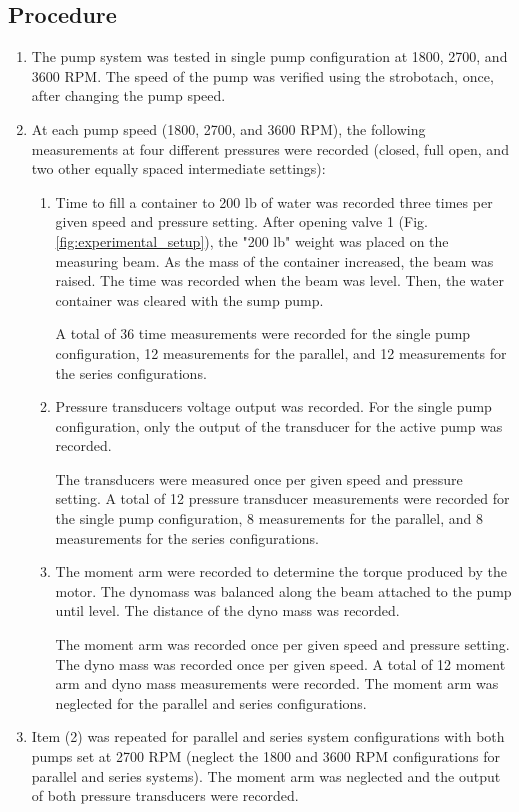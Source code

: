 \subsection{Procedure}
\begin{enumerate}[label=\arabic*.]
    \item The pump system was tested in single pump configuration at 1800, 2700, and 3600 RPM. The speed of the pump was verified using the strobotach, once, after changing the pump speed.
    \item At each pump speed (1800, 2700, and 3600 RPM), the following measurements at four different pressures were recorded (closed, full open, and two other equally spaced intermediate settings):
    \begin{enumerate}[label=\roman*.]
        \item Time to fill a container to 200 lb of water was recorded three times per given speed and pressure setting. After opening valve 1 (Fig.\ref{fig:experimental_setup}), the "200 lb" weight was placed on the measuring beam. As the mass of the container increased, the beam was raised. The time was recorded when the beam was level. Then, the water container was cleared with the sump pump. 
        
        \indent A total of 36 time measurements were recorded for the single pump configuration, 12 measurements for the parallel, and 12 measurements for the series configurations.
        \item Pressure transducers voltage output was recorded. For the single pump configuration, only the output of the transducer for the active pump was recorded. 
        
        \indent The transducers were measured once per given speed and pressure setting. A total of 12 pressure transducer measurements were recorded for the single pump configuration, 8 measurements for the parallel, and 8 measurements for the series configurations. 
        \item The moment arm were recorded to determine the torque produced by the motor. The dynomass was balanced along the beam attached to the pump until level. The distance of the dyno mass was recorded.
        
        \indent The moment arm was recorded once per given speed and pressure setting. The dyno mass was recorded once per given speed. A total of 12 moment arm and dyno mass measurements were recorded. The moment arm was neglected for the parallel and series configurations.
    \end{enumerate}
    \item Item (2) was repeated for parallel and series system configurations with both pumps set at 2700 RPM (neglect the 1800 and 3600 RPM configurations for parallel and series systems). The moment arm was neglected and the output of both pressure transducers were recorded.
\end{enumerate}